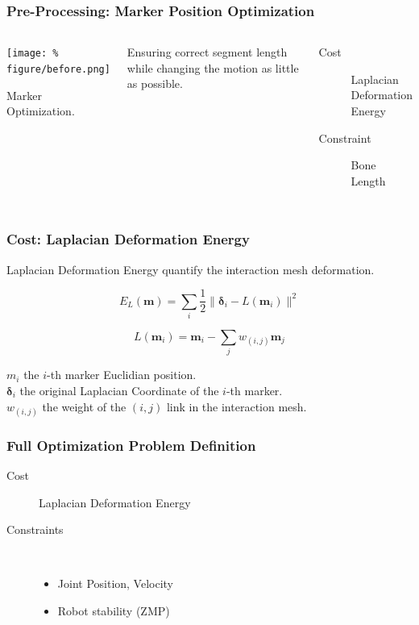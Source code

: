 \begin{frame}
  \frametitle{Pre-Processing: Marker Position Optimization}

  \begin{columns}
    \column{.45\paperwidth}
    \begin{center}
      \texttt{[image: \%
        figure/before.png]}
      \par
      \small
      Marker Optimization.
    \end{center}
    \column{.45\paperwidth}

    Ensuring correct segment length while changing the motion as
    little as possible.

    \begin{description}
      \item[Cost] Laplacian Deformation Energy
      \item[Constraint] Bone Length
    \end{description}
  \end{columns}
\end{frame}

\begin{frame}
  \frametitle{Cost: Laplacian Deformation Energy}

  \alert{Laplacian Deformation Energy} quantify the interaction mesh
  deformation.

  \begin{equation}
    E_L(\mathbf{m}) = \sum_i \frac{1}{2} \| \mathbf{\delta}_i - L(\mathbf{m}_i) \|^2
  \end{equation}

  \begin{equation}
    L(\mathbf{m}_i) = \mathbf{m}_i - \sum_j w_{(i,j)} \mathbf{m}_j
  \end{equation}

  $m_i$ the $i$-th marker Euclidian position.\\
  $\mathbf{\delta}_i$ the original Laplacian Coordinate of the $i$-th marker.\\
  $w_{(i,j)}$ the weight of the $(i,j)$ link in the interaction mesh.
\end{frame}


\begin{frame}
  \frametitle{Full Optimization Problem Definition}

  \begin{description}
  \item[Cost] Laplacian Deformation Energy
  \item[Constraints] ~\\
    \begin{itemize}
    \item Joint Position, Velocity
    \item Robot stability (ZMP)
    \end{itemize}
  \end{description}
\end{frame}


